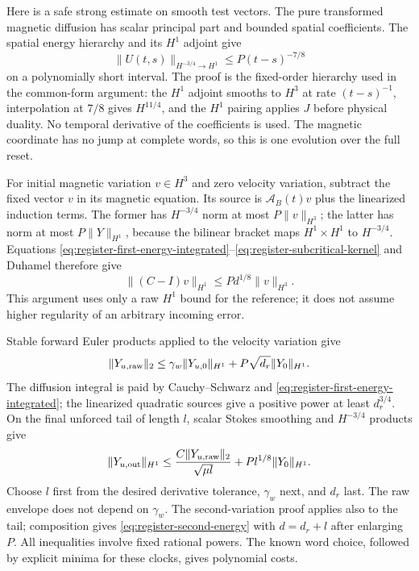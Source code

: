 \documentclass[11pt,a4paper]{amsart}
\theoremstyle{definition}
\theoremstyle{remark}
\numberwithin{equation}{section}
\newcommand{\norm}[1]{\lVert #1\rVert}
\begin{document}
Here is a safe strong estimate on smooth test vectors.  The pure transformed
magnetic diffusion has scalar principal part and bounded spatial coefficients.
The spatial energy hierarchy and its $H^1$ adjoint give
\begin{equation}\label{eq:register-subcritical-kernel}
 \norm{U(t,s)}_{H^{-3/4}\to H^1}\le P(t-s)^{-7/8}
\end{equation}
on a polynomially short interval.  The proof is the fixed-order hierarchy
used in the common-form argument: the $H^1$ adjoint smooths to $H^3$ at
rate $(t-s)^{-1}$, interpolation at $7/8$ gives $H^{11/4}$, and the
$H^1$ pairing applies $J$ before physical duality.  No temporal derivative
of the coefficients is used.  The magnetic coordinate has no jump at
complete words, so this is one evolution over the full reset.

For initial magnetic variation $v\in H^3$ and zero velocity variation,
subtract the fixed vector $v$ in its magnetic equation.  Its source is
$\mathcal A_B(t)v$ plus the linearized induction terms.  The former has
$H^{-3/4}$ norm at most $P\norm v_{H^3}$; the latter has norm at most
$P\norm Y_{H^1}$, because the bilinear bracket maps
$H^1\times H^1$ to $H^{-3/4}$.  Equations
\eqref{eq:register-first-energy-integrated}--\eqref{eq:register-subcritical-kernel}
and Duhamel therefore give
\begin{equation}\label{eq:register-strong-jump}
 \norm{(C-I)v}_{H^1}\le Pd^{1/8}\norm v_{H^3}.
\end{equation}
This argument uses only a raw $H^1$ bound for the reference; it does not
assume higher regularity of an arbitrary incoming error.

Stable forward Euler products applied to the velocity variation give
\[
 \norm{Y_{u,\rm raw}}_2\le
 \gamma_w\norm{Y_{u,0}}_{H^1}
                   +P\sqrt{d_r}\norm{Y_0}_{H^1}.
\]
The diffusion integral is paid by Cauchy--Schwarz and
\eqref{eq:register-first-energy-integrated}; the linearized quadratic
sources give a positive power at least $d_r^{3/4}$.  On the final unforced
tail of length $l$, scalar Stokes smoothing and $H^{-3/4}$ products give
\begin{equation}\label{eq:register-velocity-derivative}
 \norm{Y_{u,\rm out}}_{H^1}
 \le\frac{C\norm{Y_{u,\rm raw}}_2}{\sqrt{\mu l}}
                         +Pl^{1/8}\norm{Y_0}_{H^1}.
\end{equation}
Choose $l$ first from the desired derivative tolerance, $\gamma_w$ next,
and $d_r$ last.  The raw envelope does not depend on $\gamma_w$.
The second-variation proof applies also to the tail; composition gives
\eqref{eq:register-second-energy} with $d=d_r+l$ after enlarging $P$.
All inequalities involve fixed rational powers.  The known word choice,
followed by explicit minima for these clocks, gives polynomial costs.
\end{document}
